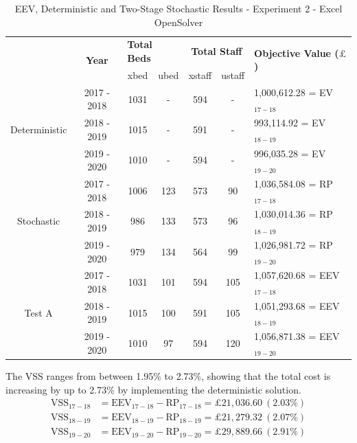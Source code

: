 \documentclass[../thesis.tex]{subfiles}
\begin{document}
\begin{table}
    \centering
    \begin{tabular}{ccccccl}\toprule
 & \multirow{2}{*}{\textbf{Year}}& \multicolumn{2}{l}{\textbf{Total Beds}} & \multicolumn{2}{c}{\textbf{Total Staff}} & \multirow{2}{*}{\textbf{Objective Value ($\pounds$)}}\\ \cmidrule(lr){3-4} \cmidrule(lr){5-6}
&& xbed           & ubed          & xstaff         & ustaff         \\ \midrule
     \multirow{3}{*}{Deterministic} & 2017 - 2018 & 1031 & - &  594 & - & 1,000,612.28 =  EV$_{17-18}$ \\ 
      & 2018 - 2019 & 1015 & - & 591 & - & 993,114.92 =  EV$_{18-19}$ \\
      & 2019 - 2020 & 1010 & - & 594 & - & 996,035.28 =  EV$_{19-20}$\\ \midrule
     \multirow{3}{*}{Stochastic} & 2017 - 2018 & 1006 & 123 & 573 & 90 & 1,036,584.08 =  RP$_{17-18}$ \\ 
      & 2018 - 2019 & 986 & 133 & 573 & 96 & 1,030,014.36 =  RP$_{18-19}$ \\
      & 2019 - 2020 & 979 & 134 & 564 & 99 & 1,026,981.72 =  RP$_{19-20}$\\ \midrule    
     \multirow{3}{*}{Test A} & 2017 - 2018 & 1031 & 101 & 594 & 105 & 1,057,620.68 =  EEV$_{17-18}$ \\ 
      & 2018 - 2019 & 1015 & 100 & 591 & 105 &  1,051,293.68 =  EEV$_{18-19}$ \\
      & 2019 - 2020 & 1010 & 97 & 594 & 120 & 1,056,871.38 =  EEV$_{19-20}$\\ \bottomrule       
    \end{tabular}
    \caption{EEV, Deterministic and Two-Stage Stochastic Results - Experiment 2 - Excel OpenSolver}
    \label{tab:eevdetstocresults2}
\end{table}

The VSS ranges from between 1.95\% to 2.73\%, showing that the total cost is increasing by up to 2.73\% by implementing the deterministic solution.
\begin{align}
    \text{VSS}_{17-18} &= \text{EEV}_{17-18} - \text{RP}_{17-18} = \pounds21,03 6.60 \ (2.03\%)  \\
    \text{VSS}_{18-19} &= \text{EEV}_{18-19} - \text{RP}_{18-19} = \pounds21,279.32  \ (2.07\%)  \\
    \text{VSS}_{19-20} &= \text{EEV}_{19-20} - \text{RP}_{19-20} = \pounds29,889.66 \ (2.91\%)  
\end{align}
\end{document}
